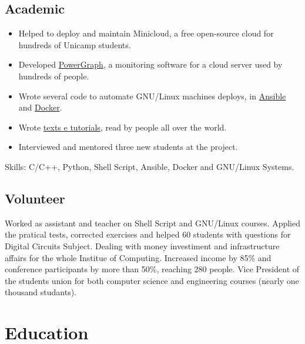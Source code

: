 \documentclass[10pt, a4paper, roman]{moderncv} %
\begin{document}
\subsection{Academic}
{
    \begin{itemize}
        \item Helped to deploy and maintain Minicloud, a free open-source cloud for hundreds of Unicamp students.
        \item Developed \href{https://github.com/Guilhermeslucas/powergraph}{PowerGraph}, a monitoring software for a cloud server used by hundreds of people.
        \item Wrote several code to automate GNU/Linux machines deploys, in \href{https://github.com/Guilhermeslucas/Ansible-Code}{Ansible} and 
            \href{https://github.com/Guilhermeslucas/Dockerfiles}{Docker}.
        \item Wrote \href{http://openpower.ic.unicamp.br/blog/}{texts e tutorials}, read by people all over the world.
        \item Interviewed and mentored three new students at the project.
    \end{itemize}
    Skills: C/C++, Python, Shell Script, Ansible, Docker and GNU/Linux Systems.
}
\subsection{Volunteer}
{
    Worked as assistant and teacher on Shell Script and GNU/Linux courses.
}
{
    Applied the pratical tests, corrected exercises and helped 60 students with questions for Digital Circuits Subject.
}
{ 
    Dealing with money investiment and infrastructure affairs for the whole Institue of Computing.
}
{
    Increased income by 85\% and conference participants by more than 50\%, reaching 280 people.
}
{
    Vice President of the students union for both computer science and engineering courses (nearly one thousand studants).
}
\section{Education}
\end{document}
